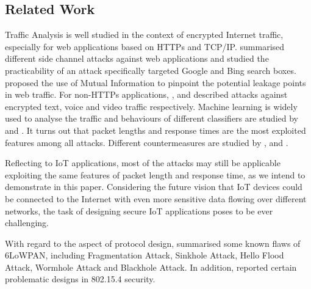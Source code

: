 \subsection{Related Work}

Traffic Analysis is well studied in the context of encrypted Internet traffic, especially for web applications based on HTTPs and TCP/IP. \cite{WebSidechannel} summarised different side channel attacks against web applications and \cite{SuggestBox} studied the practicability of an attack specifically targeted Google and Bing search boxes. \cite{PinpointWeb} proposed the use of Mutual Information to pinpoint the potential leakage points in web traffic. For non-HTTPs applications, \cite{AppleMsg}, \cite{Language} and \cite{VideoTraffic} described attacks against encrypted text, voice and video traffic respectively. Machine learning is widely used to analyse the traffic and behaviours of different classifiers are studied by \cite{HClassifier} and \cite{Peekaboo}. It turns out that packet lengths and response times are the most exploited features among all attacks. Different countermeasures are studied by \cite{TrafficMorphing}, \cite{HTTPOS} and \cite{FTE}.

Reflecting to IoT applications, most of the attacks may still be applicable exploiting the same features of packet length and response time, as we intend to demonstrate in this paper. Considering the future vision that IoT devices could be connected to the Internet with even more sensitive data flowing over different networks, the task of designing secure IoT applications poses to be ever challenging.

With regard to the aspect of protocol design, \cite{6LoWPANAtk} summarised some known flaws of 6LoWPAN, including Fragmentation Attack\cite{FragAtk}, Sinkhole Attack\cite{Sinkhole}, Hello Flood Attack\cite{HelloFlood}, Wormhole Attack\cite{Wormhole} and Blackhole Attack\cite{Blackhole}. In addition, \cite{802154SecIssues} reported certain problematic designs in 802.15.4 security\cite{802154}.